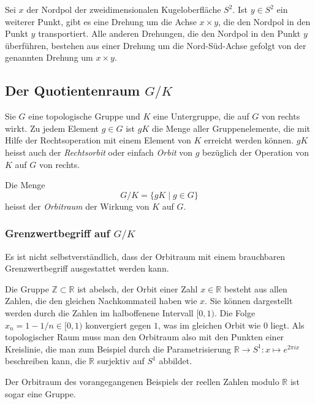 \begin{beispiel}
Sei $x$ der Nordpol der zweidimensionalen Kugeloberfläche $S^2$.
Ist $y\in S^2$ ein weiterer Punkt, gibt es eine Drehung um die Achse
$x\times y$, die den Nordpol in den Punkt $y$ transportiert.
Alle anderen Drehungen, die den Nordpol in den Punkt $y$ überführen,
bestehen aus einer Drehung um die Nord-Süd-Achse gefolgt von der
genannten Drehung um $x\times y$.
\end{beispiel}

%
%
\subsection{Der Quotientenraum $G/K$
\label{buch:nichtkomm:homogen:subsection:quotientgk}}
Sie $G$ eine topologische Gruppe und $K$ eine Untergruppe, die auf $G$
von rechts wirkt.
Zu jedem Element $g\in G$ ist $gK$ die Menge aller Gruppenelemente, 
die mit Hilfe der Rechtsoperation mit einem Element von $K$ erreicht
werden können.
$gK$ heisst auch der {\em Rechtsorbit} oder einfach {\em Orbit} von $g$
bezüglich der Operation von $K$ auf $G$ von rechts.

\begin{definition}
Die Menge 
\[
G/K
=
\{ gK \mid g\in G\}
\]
heisst der {\em Orbitraum} der Wirkung von $K$ auf $G$.
\end{definition}

%
%
\subsubsection{Grenzwertbegriff auf $G/K$}
Es ist nicht selbstverständlich, dass der Orbitraum
mit einem brauchbaren Grenzwertbegriff ausgestattet
werden kann.

\begin{beispiel}
Die Gruppe $\mathbb{Z}\subset\mathbb{R}$ ist abelsch, der Orbit einer
Zahl $x\in\mathbb{R}$ besteht aus allen Zahlen, die den gleichen
Nachkommateil haben wie $x$.
Sie können dargestellt werden durch die Zahlen im halboffenene
Intervall $[0,1)$.
Die Folge $x_n = 1-1/n\in [0,1)$ konvergiert gegen $1$, was im gleichen
Orbit wie $0$ liegt.
Als topologischer Raum muss man den Orbitraum also mit den
Punkten einer Kreislinie, die man zum Beispiel durch die
Parametrisierung $\mathbb{R}\to S^1:x\mapsto e^{2\pi ix}$ 
beschreiben kann, die $\mathbb{R}$ surjektiv auf $S^1$ abbildet.
\end{beispiel}

Der Orbitraum des vorangegangenen Beispiels der reellen Zahlen
modulo $\mathbb{R}$ ist sogar eine Gruppe.

